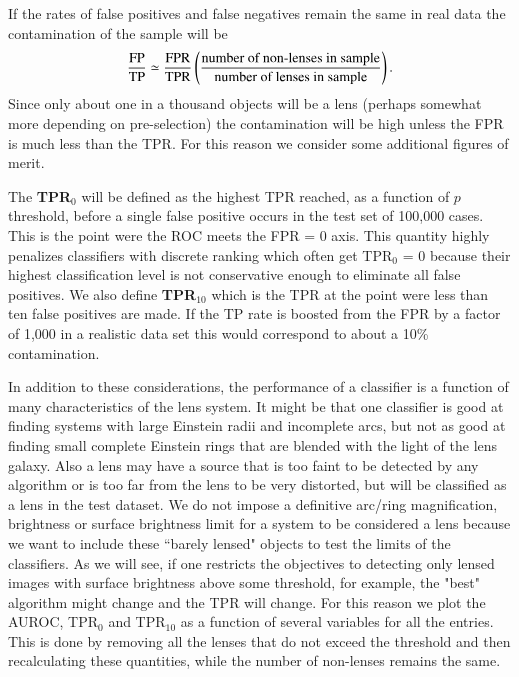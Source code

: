 \documentclass{aa}
\begin{document}
If the rates of false positives and false negatives remain the same in real data  the contamination of the sample will be
\begin{align}
\frac{\rm FP}{\rm TP} \simeq \frac{\rm FPR}{\rm TPR} \left(\frac{\textrm{number of non-lenses in sample}}{\textrm{number of lenses in sample}} \right).
\end{align}
Since only about one in a thousand objects will be a lens (perhaps somewhat more depending on pre-selection) the contamination will be high unless the FPR is much less than the TPR.  For this reason we consider some additional figures of merit.

The {\bf TPR$_0$} will be defined as the highest TPR reached, as a function of $p$ threshold, before a single false positive occurs in the test set of 100,000 cases.  This is the point were the ROC meets the FPR = 0 axis.  This quantity highly penalizes classifiers with discrete ranking which often get TPR$_0$ = 0 because their highest classification level is not conservative enough to eliminate all false positives.  We also define {\bf TPR$_{10}$} which is the TPR at the point were less than ten false positives are made.  If the TP rate is boosted from the FPR by a factor of 1,000 in a realistic data set this would correspond to about a 10\% contamination.

In addition to these considerations, the performance of a classifier is a function of many characteristics of the lens system.  It might be that one classifier is good at finding systems with large Einstein radii and incomplete arcs, but not as good at finding small complete Einstein rings that are blended with the light of the lens galaxy.  Also a lens may have a source that is too faint to be detected by any algorithm or is too far from the lens to be very distorted, but will be classified as a lens in the test dataset.    We do not impose a definitive arc/ring magnification, brightness or surface brightness limit for a system to be considered a lens because we 
want to include these ``barely lensed" objects to test the limits of the classifiers.  As we will see, if one restricts the objectives to detecting only lensed images with surface brightness above some threshold, for example, the "best" algorithm might change and the TPR will change.  For this reason we plot the AUROC, TPR$_0$ and TPR$_{10}$ as a function of several variables for all the entries.  This is done by removing all the lenses that do not exceed the threshold and then recalculating  these quantities, while the number of non-lenses remains the same.
\end{document}
